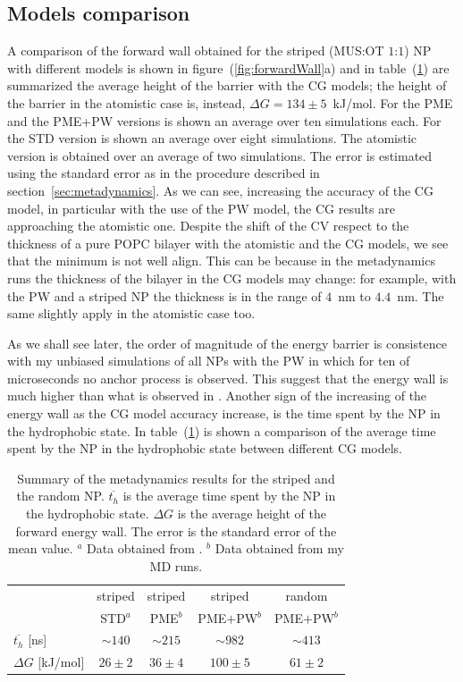 \subsection{Models comparison}
A comparison of the forward wall obtained for the striped (\ac{MUS}:\ac{OT} $1$:$1$) \ac{NP} with different models is shown in figure~(\ref{fig:forwardWall}a) and in table~(\ref{tab:hydroTime}) are summarized the average height of the barrier with the \ac{CG} models; the height of the barrier in the atomistic case is, instead, $\Delta G = 134 \pm 5$~kJ/mol. For the \ac{PME} and the \ac{PME}+\ac{PW} versions is shown an average over ten simulations each. For the STD version is shown an average over eight simulations. The atomistic version is obtained over an average of two simulations. The error is estimated using the standard error as in the procedure described in section~\ref{sec:metadynamics}. As we can see, increasing the accuracy of the \ac{CG} model, in particular with the use of the \ac{PW} model, the \ac{CG} results are approaching the atomistic one. Despite the shift of the \ac{CV} respect to the thickness of a pure \ac{POPC} bilayer with the atomistic and the \ac{CG} models, we see that the minimum is not well align. This can be because in the metadynamics runs the thickness of the bilayer in the \ac{CG} models may change: for example, with the \ac{PW} and a striped \ac{NP} the thickness is in the range of $4$~nm to $4.4$~nm. The same slightly apply in the atomistic case too.

As we shall see later, the order of magnitude of the energy barrier is consistence with my unbiased simulations of all \acp{NP} with the \ac{PW} in which for ten of microseconds no anchor process is observed. This suggest that the energy wall is much higher than what is observed in \cite{ourPaper}. Another sign of the increasing of the energy wall as the \ac{CG} model accuracy increase, is the time spent by the \ac{NP} in the hydrophobic state. In table~(\ref{tab:hydroTime}) is shown a comparison of the average time spent by the \ac{NP} in the hydrophobic state between different \ac{CG} models.
\begin{table}[h!t]
	\centering
	\begin{tabular}{lcccc}
		\toprule
		\,					& striped	& striped		& striped					& random \\
		\,					& STD$^a$	& \acs{PME}$^b$	& \acs{PME}$+$\acs{PW}$^b$	& \acs{PME}$+$\acs{PW}$^b$ \\ \toprule
	$\overline{t_{h}}$ [ns]	& $\sim 140$& $\sim 215$	& $\sim 982$				& $\sim 413$ \\ \midrule
	$\Delta G$ [kJ/mol] 	& $26 \pm 2$& $36 \pm 4$	& $100 \pm 5$				& $61 \pm 2$ \\ \bottomrule
	\end{tabular}
	\caption{Summary of the metadynamics results for the striped and the random \acs{NP}. $\overline{t_h}$ is the average time spent by the \acs{NP} in the hydrophobic state. $\Delta G$ is the average height of the forward energy wall. The error is the standard error of the mean value. $^a$ Data obtained from \cite{ourPaper}. $^b$ Data obtained from my \acs{MD} runs.}
	\label{tab:hydroTime}
\end{table}

